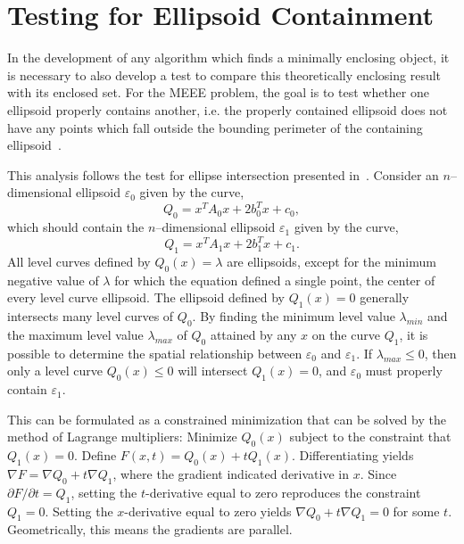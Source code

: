 \section{Testing for Ellipsoid Containment}\label{section:containment}

In the development of any algorithm which finds a minimally enclosing object, it is necessary to also develop a test to
compare this theoretically enclosing result with its enclosed set. For the MEEE problem, the goal is to test whether one
ellipsoid properly contains another, i.e. the properly contained ellipsoid does not have any points which fall outside
the bounding perimeter of the containing ellipsoid~\cite{yildirim06}.

This analysis follows the test for ellipse intersection presented in~\cite{eberly00}. Consider an $n$--dimensional
ellipsoid $\varepsilon_0$ given by the curve,
\begin{equation}
    Q_0 = x^TA_0x + 2b_0^Tx + c_0,
\end{equation}
which should contain the $n$--dimensional ellipsoid $\varepsilon_1$ given by the curve,
\begin{equation}
    Q_1 = x^TA_1x + 2b_1^Tx + c_1.
\end{equation}
All level curves defined by $Q_0(x)=\lambda$ are ellipsoids, except for the minimum negative value of $\lambda$ for
which the equation defined a single point, the center of every level curve ellipsoid. The ellipsoid defined by
$Q_1(x)=0$ generally intersects many level curves of $Q_0$. By finding the minimum level value $\lambda_{min}$ and the
maximum level value $\lambda_{max}$ of $Q_0$ attained by any $x$ on the curve $Q_1$, it is possible to determine the
spatial relationship between $\varepsilon_0$ and $\varepsilon_1$. If $\lambda_{max}\leq 0$, then only a level curve
$Q_0(x)\leq 0$ will intersect $Q_1(x)=0$, and $\varepsilon_0$ must properly contain $\varepsilon_1$.

This can be formulated as a constrained minimization that can be solved by the method of Lagrange multipliers: Minimize
$Q_0(x)$ subject to the constraint that $Q_1(x)=0$. Define $F(x,t)=Q_0(x)+tQ_1(x)$. Differentiating yields $\nabla
F=\nabla Q_0+t\nabla Q_1$, where the gradient indicated derivative in $x$. Since $\partial{F}/\partial{t}=Q_1$, setting the
$t$-derivative equal to zero reproduces the constraint $Q_1=0$. Setting the $x$-derivative equal to zero yields $\nabla
Q_0+t\nabla Q_1=0$ for some $t$. Geometrically, this means the gradients are parallel.

